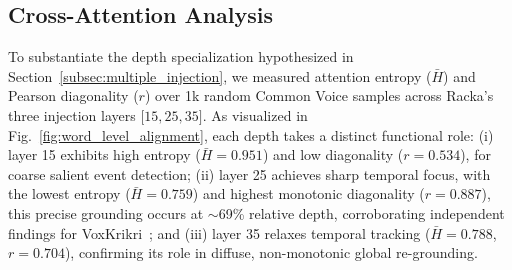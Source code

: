 \documentclass{article}
\begin{document}
\begin{table}[h]
\centering
\caption{Ablation study for Hungarian on the validation set. $\Delta_W$ represents the WER degradation compared to the Full model.}
\label{tab:ablation}
\footnotesize
{}
\end{table}

\subsection{Cross-Attention Analysis}
\noindent
To substantiate the depth specialization hypothesized in Section~\ref{subsec:multiple_injection}, we measured attention entropy ($\bar{H}$) and Pearson diagonality ($r$) over 1k random Common Voice samples across Racka's three injection layers $\lbrack15,25,35\rbrack$. As visualized in Fig.~\ref{fig:word_level_alignment}, each depth takes a distinct functional role: (i) layer 15 exhibits high entropy ($\bar{H} = 0.951$) and low diagonality ($r = 0.534$), for coarse salient event detection; (ii) layer 25 achieves sharp temporal focus, with the lowest entropy ($\bar{H} = 0.759$) and highest monotonic diagonality ($r = 0.887$), this precise grounding occurs at $\sim$69\% relative depth, corroborating independent findings for VoxKrikri~\cite{damianos2025voxkrikriunifyingspeechlanguage}; and (iii) layer 35 relaxes temporal tracking ($\bar{H} = 0.788$, $r = 0.704$), confirming its role in diffuse, non-monotonic global re-grounding.
\end{document}
